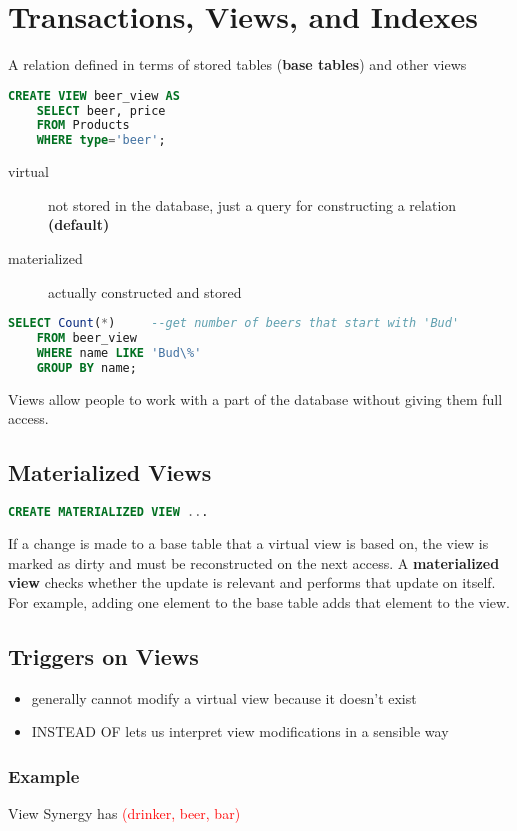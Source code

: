 \documentclass[12pt]{article}
\begin{document}
\section{Transactions, Views, and Indexes}
A relation defined in terms of stored tables (\textbf{base tables}) and other
views
\begin{lstlisting}[language=sql, caption=virtual view creation]
  CREATE VIEW beer_view AS
    SELECT beer, price
    FROM Products
    WHERE type='beer';
\end{lstlisting}
\begin{description}
  \item[virtual] not stored in the database, just a query for constructing a
    relation \textbf{(default)}
  \item[materialized] actually constructed and stored
\end{description}
\begin{lstlisting}[language=sql, caption=virtual view usage]
  SELECT Count(*)     --get number of beers that start with 'Bud'
    FROM beer_view
    WHERE name LIKE 'Bud\%'
    GROUP BY name;
\end{lstlisting}
Views allow people to work with a part of the database without giving them full
access.

\subsection{Materialized Views}
\begin{lstlisting}[language=sql, caption=materialized view]
  CREATE MATERIALIZED VIEW ...
\end{lstlisting}
If a change is made to a base table that a virtual view is based on, the view is
marked as dirty and must be reconstructed on the next access.
A \textbf{materialized view} checks whether the update is relevant and performs
that update on itself. For example, adding one element to the base table adds
that element to the view.
\subsection{Triggers on Views}
\begin{itemize}
  \item generally cannot modify a virtual view because it doesn't exist
  \item INSTEAD OF lets us interpret view modifications in a sensible way
\end{itemize}
\subsubsection{Example}
View Synergy has \textcolor{red}{(drinker, beer, bar)}
\end{document}
